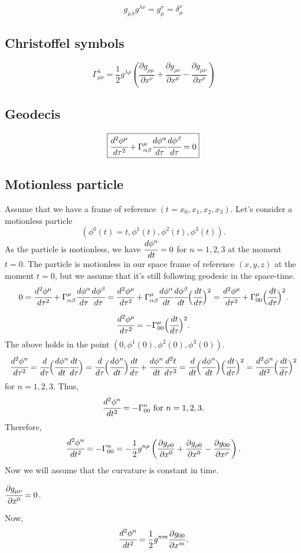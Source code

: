 \documentclass[main.tex]{subfiles}
\begin{document}
$$
\boxed{g_{\mu\lambda}g^{\lambda\nu} = g^\nu_\mu = \delta^\nu_\mu}
$$

\subsection{Christoffel symbols}
$$
\boxed{\Gamma^\lambda_{\mu\nu} = \frac{1}{2} g^{\lambda\rho} \left( \frac{\partial g_{\rho\mu}}{\partial x^\nu} + \frac{\partial g_{\rho\nu}}{\partial x^\mu} - \frac{\partial g_{\mu\nu}}{\partial x^\rho} \right)}
$$

\subsection{Geodecis}
$$
\boxed{\cfrac{d^2\phi^\mu}{d\tau^2} + \Gamma^\mu_{\alpha\beta}\cfrac{d\phi^\alpha}{d\tau}\cfrac{d\phi^\beta}{d\tau} = 0}
$$

\subsection{Motionless particle}
Assume that we have a frame of reference $(t = x_0, x_1, x_2, x_3)$. Let's consider a motionless particle
$$(\phi^0(t) = t, \phi^1(t), \phi^2(t), \phi^3(t)). $$
As the particle is motionless, we have $\cfrac{d\phi^n}{dt} = 0$ for $n=1,2,3$ at the moment $t=0$. The particle is motionless in our space frame of reference $(x,y,z)$ at the moment $t=0$, but we assume that it's still following geodesic in the space-time.
$$
0 = \cfrac{d^2\phi^\mu}{d\tau^2} + \Gamma^\mu_{\alpha\beta}\cfrac{d\phi^\alpha}{d\tau}\cfrac{d\phi^\beta}{d\tau} = \cfrac{d^2\phi^\mu}{d\tau^2} + \Gamma^\mu_{\alpha\beta}\cfrac{d\phi^\alpha}{dt}\cfrac{d\phi^\beta}{dt}\Big(\cfrac{dt}{d\tau}\Big)^2 = \cfrac{d^2\phi^\mu}{d\tau^2} + \Gamma^\mu_{00}\Big(\cfrac{dt}{d\tau}\Big)^2.
$$

$$
\cfrac{d^2\phi^\mu}{d\tau^2} = -\Gamma^\mu_{00}\Big(\cfrac{dt}{d\tau}\Big)^2.
$$
The above holds in the point $(0, \phi^1(0), \phi^2(0), \phi^3(0))$.
$$
\cfrac{d^2\phi^n}{d\tau^2} = \cfrac{d}{d\tau}\Big(\cfrac{d\phi^n}{dt}\cfrac{dt}{d\tau}\Big) = 
\cfrac{d}{d\tau}\Big(\cfrac{d\phi^n}{dt}\Big)\cfrac{dt}{d\tau} + \cfrac{d\phi^n}{dt}\cfrac{d^2t}{d\tau^2} = 
\cfrac{d}{dt}\Big(\cfrac{d\phi^n}{dt}\Big)\Big(\cfrac{dt}{d\tau}\Big)^2 = \cfrac{d^2\phi^n}{dt^2}\Big(\cfrac{dt}{d\tau}\Big)^2
$$
for $n=1,2,3$. Thus,
$$
\cfrac{d^2\phi^n}{dt^2} = -\Gamma^n_{00} \text{ for } n=1,2,3.
$$
Therefore, 
$$
\cfrac{d^2\phi^n}{dt^2} = -\Gamma^n_{00} = -\frac{1}{2} g^{n\rho} \left( \frac{\partial g_{\rho 0}}{\partial x^0} + \frac{\partial g_{\rho 0}}{ \partial x^0} - \frac{\partial g_{0 0}}{\partial x^\rho} \right).
$$
Now we will assume that the curvature is constant in time.
\begin{assumption}
$\cfrac{\partial g_{\mu\nu}}{\partial x^0} = 0$. 
\end{assumption}
Now,
$$
\cfrac{d^2\phi^n}{dt^2} = \frac{1}{2} g^{nm}\frac{\partial g_{0 0}}{\partial x^m}.
$$
\end{document}
